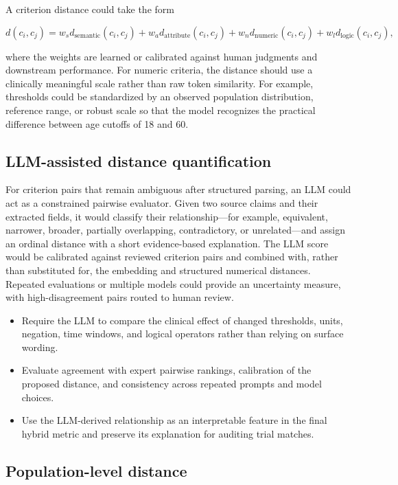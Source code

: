 \documentclass[11pt]{article}
\begin{document}
A criterion distance could take the form

\[
d(c_i,c_j)
=
w_s d_{\mathrm{semantic}}(c_i,c_j)
+ w_a d_{\mathrm{attribute}}(c_i,c_j)
+ w_n d_{\mathrm{numeric}}(c_i,c_j)
+ w_l d_{\mathrm{logic}}(c_i,c_j),
\]

where the weights are learned or calibrated against human judgments and downstream performance. For numeric criteria, the distance should use a clinically meaningful scale rather than raw token similarity. For example, thresholds could be standardized by an observed population distribution, reference range, or robust scale so that the model recognizes the practical difference between age cutoffs of 18 and 60.

\subsection*{LLM-assisted distance quantification}

For criterion pairs that remain ambiguous after structured parsing, an LLM could act as a constrained pairwise evaluator. Given two source claims and their extracted fields, it would classify their relationship---for example, equivalent, narrower, broader, partially overlapping, contradictory, or unrelated---and assign an ordinal distance with a short evidence-based explanation. The LLM score would be calibrated against reviewed criterion pairs and combined with, rather than substituted for, the embedding and structured numerical distances. Repeated evaluations or multiple models could provide an uncertainty measure, with high-disagreement pairs routed to human review.

\begin{itemize}
    \item Require the LLM to compare the clinical effect of changed thresholds, units, negation, time windows, and logical operators rather than relying on surface wording.
    \item Evaluate agreement with expert pairwise rankings, calibration of the proposed distance, and consistency across repeated prompts and model choices.
    \item Use the LLM-derived relationship as an interpretable feature in the final hybrid metric and preserve its explanation for auditing trial matches.
\end{itemize}

\subsection*{Population-level distance}
\end{document}
